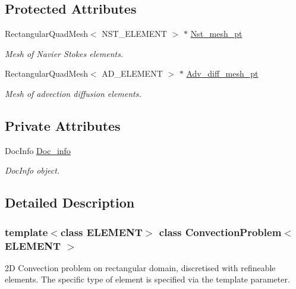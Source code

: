 \subsection*{Protected Attributes}
\begin{DoxyCompactItemize}
\item 
Rectangular\+Quad\+Mesh$<$ N\+S\+T\+\_\+\+E\+L\+E\+M\+E\+NT $>$ $\ast$ \hyperlink{classConvectionProblem_a3bf695d1bd7b59b97aee57cfe66e4bcb}{Nst\+\_\+mesh\+\_\+pt}
\begin{DoxyCompactList}\small\item\em Mesh of Navier Stokes elements. \end{DoxyCompactList}\item 
Rectangular\+Quad\+Mesh$<$ A\+D\+\_\+\+E\+L\+E\+M\+E\+NT $>$ $\ast$ \hyperlink{classConvectionProblem_ac4dfae66888e0f70a71b10482d20bdc0}{Adv\+\_\+diff\+\_\+mesh\+\_\+pt}
\begin{DoxyCompactList}\small\item\em Mesh of advection diffusion elements. \end{DoxyCompactList}\end{DoxyCompactItemize}
\subsection*{Private Attributes}
\begin{DoxyCompactItemize}
\item 
Doc\+Info \hyperlink{classConvectionProblem_afc3f74343209527c9d30b5207d19983d}{Doc\+\_\+info}
\begin{DoxyCompactList}\small\item\em Doc\+Info object. \end{DoxyCompactList}\end{DoxyCompactItemize}


\subsection{Detailed Description}
\subsubsection*{template$<$class E\+L\+E\+M\+E\+NT$>$\newline
class Convection\+Problem$<$ E\+L\+E\+M\+E\+N\+T $>$}

2D Convection problem on rectangular domain, discretised with refineable elements. The specific type of element is specified via the template parameter.

